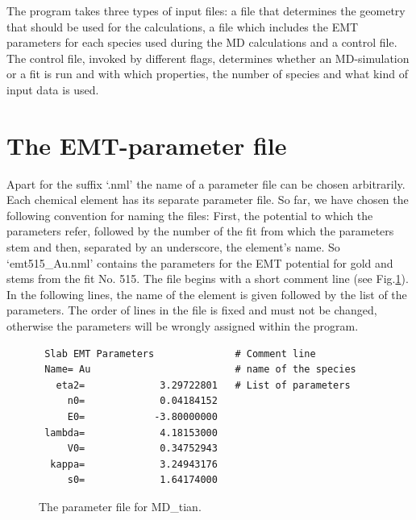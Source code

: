 \documentclass[twoside, 11pt, titlepage, captions=nooneline, a4paper, headsepline]{scrbook}%
\newcommand{\9}{\mathrm}
\newcommand{\0}{\,\mathrm}
\begin{document}
The program takes three types of input files: a file that determines the geometry that should be used for the calculations, a file which includes the EMT parameters for each species used during the MD calculations and a control file. The control file, invoked by different flags, determines whether an MD-simulation or a fit is run and with which properties, the number of species and what kind of input data is used.

\section{The EMT-parameter file}
Apart for the suffix `.nml' the name of a parameter file can be chosen arbitrarily. Each chemical element has its separate parameter file. So far, we have chosen the following convention for naming the files: First, the potential to which the parameters refer, followed by the number of the fit from which the parameters stem and then, separated by an underscore, the element's name. So `emt515\_Au.nml' contains the parameters for the EMT potential for gold and stems from the fit No. 515. The file begins with a short comment line (see Fig.\ref{Fig:nmlfile}). In the following lines, the name of the element is given followed by the list of the parameters. The order of lines in the file is fixed and must not be changed, otherwise the parameters will be wrongly assigned within the program.
\begin{figure}[t!]
\begin{verbatim}
 Slab EMT Parameters              # Comment line
 Name= Au                         # name of the species
   eta2=             3.29722801   # List of parameters
     n0=             0.04184152
     E0=            -3.80000000
 lambda=             4.18153000
     V0=             0.34752943
  kappa=             3.24943176
     s0=             1.64174000
\end{verbatim}
\caption{\label{Fig:nmlfile}The parameter file for MD\_tian.}
\end{figure}
\end{document}
